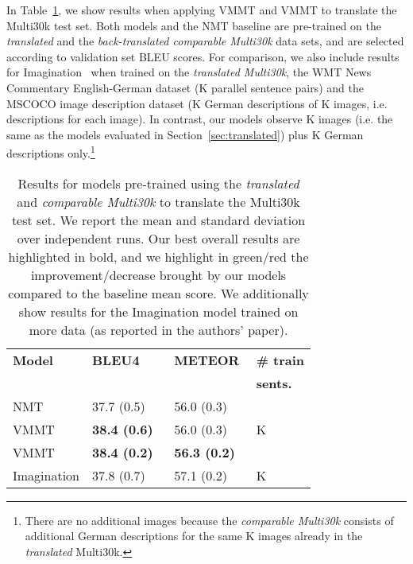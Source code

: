 \documentclass[11pt,a4paper]{article}
\newcommand{\green}[1]{\textcolor{OliveGreen}{#1}}
\newcommand{\white}[1]{\textcolor{White}{#1}}
\newcommand{\cond}{VMMT\xspace}
\newcommand{\uncond}{VMMT\xspace}
\begin{document}
In Table~\ref{tab:backtrans_results}, we show results when applying \uncond and \cond to translate the Multi30k test set. Both models and the NMT baseline are pre-trained on the \emph{translated} and the \emph{back-translated comparable Multi30k} data sets, and are selected according to validation set BLEU scores.
For comparison, we also include results for Imagination~\citep{ElliottKadar2017} when trained on the \emph{translated Multi30k}, the WMT News Commentary English-German dataset (K parallel sentence pairs) and the MSCOCO image description dataset (K German descriptions of K images, i.e.  descriptions for each image).
In contrast, our models observe K images (i.e. the same as the models evaluated in Section~\ref{sec:translated}) plus K German descriptions only.\footnote{There are no additional images because the \emph{comparable Multi30k} consists of additional German descriptions for the same K images already in the \emph{translated} Multi30k.}

\begin{table}[t!]
\centering
\resizebox{\linewidth}{!} {
\begin{tabular}{llll}
\toprule
{\bf Model} & {\bf BLEU4} & {\bf METEOR} & \bf \# train \\
&&& \bf sents. \\
\midrule
NMT  &
    37.7 (0.5) & 56.0 (0.3) & \multirow{3}{*}{K}\\

\uncond  &
	{\bf 38.4 (0.6)} \white{-}\green{} &
    56.0 (0.3) \white{-}\green{} \\

\cond  &
	{\bf 38.4 (0.2)} \white{-}\green{} &
    {\bf 56.3 (0.2)} \white{-}\green{} \\

\midrule
Imagination &
	37.8 (0.7) &  57.1 (0.2) & K \\
\bottomrule
\end{tabular}
}
\caption{Results for models pre-trained using the \emph{translated} and \emph{comparable Multi30k} to translate the Multi30k test set. We report the mean and standard deviation over  independent runs.
Our best overall results are highlighted in bold, and we highlight in green/red the improvement/decrease brought by our models compared to the baseline mean score.
We additionally show results for the Imagination model trained on  more data (as reported in the authors' paper).}
\label{tab:backtrans_results}
\end{table}
\end{document}
